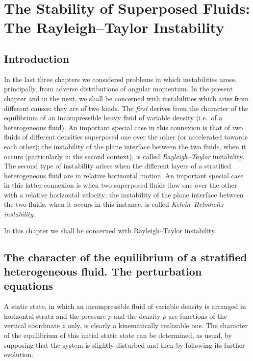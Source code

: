 \chapter{The Stability of Superposed Fluids: The Rayleigh--Taylor Instability}
\label{ch:10}

\section{Introduction}\label{sec:90}

In the last three chapters we considered problems in which instabilities arose, principally, from adverse distributions of angular momentum. In the present chapter and in the next, we shall be concerned with instabilities which arise from different causes: they are of two kinds. The \emph{first} derives from the character of the equilibrium of an incompressible heavy fluid of variable density (i.e.\ of a heterogeneous fluid). An important special case in this connexion is that of two fluids of different densities superposed one over the other (or accelerated towards each other); the instability of the plane interface between the two fluids, when it occurs (particularly in the second context), is called \emph{Rayleigh--Taylor} instability. The second type of instability arises when the different layers of a stratified heterogeneous fluid are in relative horizontal motion. An important special case in this latter connexion is when two superposed fluids flow one over the other with a relative horizontal velocity; the instability of the plane interface between the two fluids, when it occurs in this instance, is called \emph{Kelvin--Helmholtz instability}.

In this chapter we shall be concerned with Rayleigh--Taylor instability.

\section{The character of the equilibrium of a stratified heterogeneous fluid. The perturbation equations}\label{sec:91}

A static state, in which an incompressible fluid of variable density is arranged in horizontal strata and the pressure $p$ and the density $\rho$ are functions of the vertical coordinate $z$ only, is clearly a kinematically realizable one. The character of the equilibrium of this initial static state can be determined, as usual, by supposing that the system is slightly disturbed and then by following its further evolution.

